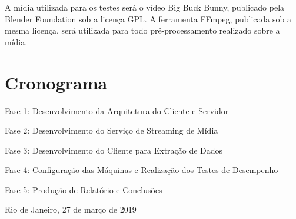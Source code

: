 \documentclass[a4paper,12pt]{article}
\begin{document}
A mídia utilizada para os testes será o vídeo Big Buck Bunny, publicado pela Blender Foundation sob a licença GPL. A ferramenta FFmpeg, publicada sob a mesma licença, será utilizada para todo pré-processamento realizado sobre a mídia.

\section{Cronograma}

Fase 1: Desenvolvimento da Arquitetura do Cliente e Servidor

Fase 2: Desenvolvimento do Serviço de Streaming de Mídia

Fase 3: Desenvolvimento do Cliente para Extração de Dados

Fase 4: Configuração das Máquinas e Realização dos Testes de Desempenho

Fase 5: Produção de Relatório e Conclusões





\vspace{2cm}
\noindent
Rio de Janeiro, 27 de março de 2019

\vspace{1cm}
\begin{flushright}
      \parbox{10cm}{
            \hrulefill

            \vspace{-.375cm}

            \vspace{0.9cm}
            \hrulefill

            \vspace{-.375cm}
 
            \vspace{0.9cm}
      }
\end{flushright}
\vfill
      
\end{document}
